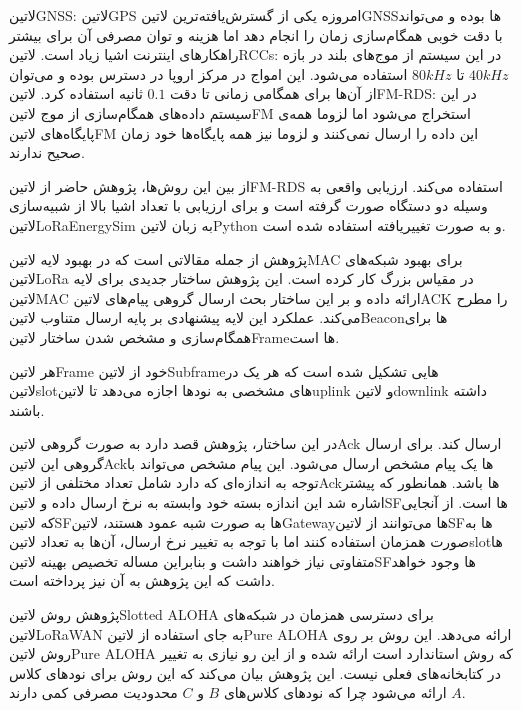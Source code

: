  ‌لاتین{GNSS}: ‌لاتین{GPS} امروزه یکی از گسترش‌یافته‌ترین ‌لاتین{GNSS}ها بوده و می‌تواند با دقت خوبی همگام‌سازی زمان را انجام دهد اما هزینه و توان مصرفی آن برای بیشتر راهکارهای اینترنت اشیا زیاد است.
 ‌لاتین{RCCs}:‌ در این سیستم از موج‌های بلند در بازه $40kHz$ تا $80kHz$ استفاده می‌شود. این امواج در مرکز اروپا در دسترس بوده و می‌توان از آن‌ها برای همگامی زمانی تا دقت $0.1$ ثانیه استفاده کرد.
 ‌لاتین{FM-RDS}: در این سیستم داده‌های همگام‌سازی از موج ‌لاتین{FM} استخراج می‌شود اما لزوما همه‌ی پایگاه‌های ‌لاتین{FM} این داده را ارسال نمی‌کنند و لزوما نیز همه پایگاه‌ها خود زمان صحیح ندارند.

از بین این روش‌ها، پژوهش حاضر از ‌لاتین{FM-RDS} استفاده می‌کند. ارزیابی واقعی به وسیله دو دستگاه صورت گرفته است و برای ارزیابی با تعداد اشیا بالا از شبیه‌سازی ‌لاتین{LoRaEnergySim} به زبان ‌لاتین{Python} و به صورت تغییریافته استفاده شده است.


پژوهش  از جمله مقالاتی است که در بهبود لایه ‌لاتین{MAC} برای بهبود شبکه‌های ‌لاتین{LoRa} در مقیاس بزرگ کار کرده است.
این پژوهش ساختار جدیدی برای لایه ‌لاتین{MAC} ارائه داده و بر این ساختار بحث ارسال گروهی پیام‌های ‌لاتین{ACK} را مطرح می‌کند.
عملکرد این لایه پیشنهادی بر پایه ارسال متناوب ‌لاتین{Beacon}ها برای همگام‌سازی و مشخص شدن ساختار ‌لاتین{Frame}ها است.

هر ‌لاتین{Frame} خود از ‌لاتین{Subframe}هایی تشکیل شده است که هر یک در ‌لاتین{slot}های مشخصی به نودها
اجازه می‌دهد تا ‌لاتین{uplink} و ‌لاتین{downlink} داشته باشند.

در این ساختار، پژوهش قصد دارد به صورت گروهی ‌لاتین{Ack} ارسال کند. برای ارسال گروهی این ‌لاتین{Ack}ها یک پیام مشخص ارسال می‌شود.
این پیام مشخص می‌تواند با توجه به اندازه‌ای که دارد شامل تعداد مختلفی از ‌لاتین{Ack}ها باشد. همانطور که پیشتر اشاره شد این اندازه بسته خود وابسته به
نرخ ارسال داده و ‌لاتین{SF}ها است. از آنجایی که ‌لاتین{SF}ها به صورت شبه عمود هستند، ‌لاتین{Gateway}ها می‌توانند از ‌لاتین{SF}ها به صورت همزمان
استفاده کنند اما با توجه به تغییر نرخ ارسال، آن‌ها به تعداد ‌لاتین{slot}ها متفاوتی نیاز خواهند داشت و بنابراین مساله تخصیص بهینه ‌لاتین{SF}ها وجود خواهد داشت که این پژوهش به
آن نیز پرداخته است.


پژوهش  روش ‌لاتین{Slotted ALOHA} برای دسترسی همزمان در شبکه‌های ‌لاتین{LoRaWAN} به جای استفاده از ‌لاتین{Pure ALOHA} ارائه می‌دهد.
این روش بر روی روش ‌لاتین{Pure ALOHA} که روش استاندارد است ارائه شده و از این رو نیازی به تغییر در کتابخانه‌های فعلی نیست.
این پژوهش بیان می‌کند که این روش برای نودهای کلاس $A$ ارائه می‌شود چرا که نودهای کلاس‌های $B$ و $C$ محدودیت مصرفی کمی دارند.

